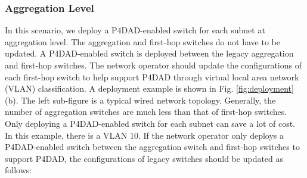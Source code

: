 \documentclass[a4paper,fleqn]{cas-dc}
\begin{document}
        \subsubsection{Aggregation Level}\label{sec:aggregation}
            In this scenario, we deploy a P4DAD-enabled switch for each subnet at aggregation level. The aggregation and first-hop switches do not have to be updated. A P4DAD-enabled switch is deployed between the legacy aggregation and first-hop switches. The network operator should update the configurations of each first-hop switch to help support P4DAD through virtual local area network (VLAN) classification. A deployment example is shown in Fig. \ref{fig:deployment} (b). The left sub-figure is a typical wired network topology. Generally, the number of aggregation switches are much less than that of first-hop switches. Only deploying a P4DAD-enabled switch for each subnet can save a lot of cost. In this example, there is a VLAN 10. If the network operator only deploys a P4DAD-enabled switch between the aggregation switch and first-hop switches to support P4DAD, the configurations of legacy switches should be updated as follows:
\end{document}
